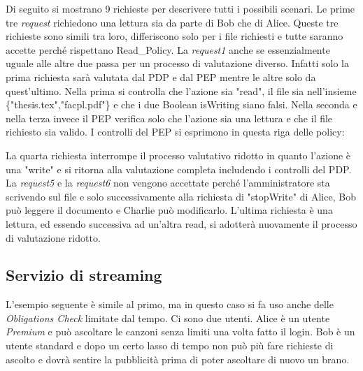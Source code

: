 
Di seguito si mostrano 9 richieste per descrivere tutti i possibili scenari.
Le prime tre \emph{request} richiedono una lettura sia da parte di Bob che di Alice. Queste tre richieste sono simili tra loro,
differiscono solo per i file richiesti e tutte saranno accette perché rispettano Read\_Policy. La \emph{request1} anche
se essenzialmente uguale alle altre due passa per un processo di valutazione diverso. Infatti solo la prima richiesta
sarà valutata dal \ac{PDP} e dal \ac{PEP} mentre le altre solo da quest'ultimo. Nella prima si controlla che l'azione sia "read",
il file sia nell'insieme \{"thesis.tex","facpl.pdf"\} e che i due Boolean isWriting siano falsi. Nella seconda e nella terza
invece il \ac{PEP} verifica solo che l'azione sia una lettura e che il file richiesto sia valido.
I controlli del \ac{PEP} si esprimono in questa riga delle policy:


La quarta richiesta interrompe il processo valutativo ridotto in quanto l'azione è una "write" e si ritorna alla valutazione
completa includendo i controlli del \ac{PDP}. La \emph{request5} e la \emph{request6} non vengono accettate perché l'amministratore
sta scrivendo sul file e solo successivamente alla richiesta di "stopWrite" di Alice, Bob può leggere il documento e Charlie può modificarlo.
L'ultima richiesta è una lettura, ed essendo successiva ad un'altra read, si adotterà nuovamente il processo di valutazione ridotto.

\subsection{Servizio di streaming}
\label{sub:Stream_Code_Sec}
L'esempio seguente è simile al primo, ma in questo caso si fa uso anche delle \emph{Obligations Check} limitate dal tempo.
Ci sono due utenti. Alice è un utente \emph{Premium} e può ascoltare le canzoni senza limiti una volta fatto il login. Bob
è un utente standard e dopo un certo lasso di tempo non può più fare richieste di ascolto e dovrà sentire la pubblicità prima
di poter ascoltare di nuovo un brano.

